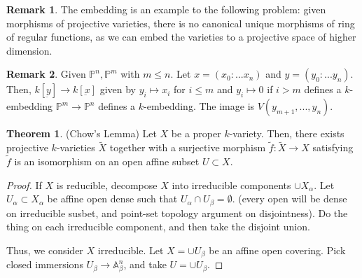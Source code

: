 \documentclass{article}
\theoremstyle{definition}
\newtheorem{theorem}{Theorem}[section]
\theoremstyle{definition}
\theoremstyle{definition}
\newtheorem{remark}{Remark}[theorem]
\theoremstyle{definition}
\theoremstyle{definition}
\theoremstyle{definition}
\theoremstyle{definition}
\begin{document}
\begin{tcolorbox}[colback=green!5!white,colframe=green!30!white]
\begin{remark}
The embedding is an example to the following problem: given morphisms of projective varieties, there is no canonical unique morphisms of ring of regular functions, as we can embed the varieties to a projective space of higher dimension. 
\end{remark}
\end{tcolorbox}


\begin{tcolorbox}[colback=green!5!white,colframe=green!30!white]
\begin{remark}
Given $\mathbb{P}^n, \mathbb{P}^m$ with $m\leq n$. Let $x=(x_0:...x_n)$ and $y=(y_0:...y_n)$. Then, $k[\underbar{y}]\to k[\underbar{x}]$ given by $y_i\mapsto x_i$ for $i\leq m$ and $y_i\mapsto 0$ if $i>m$ defines a $k$-embedding $\mathbb{P}^m\to \mathbb{P}^n$ defines a $k$-embedding. The image is $V(y_{m+1},...,y_n)$. 
\end{remark}
\end{tcolorbox}



\begin{tcolorbox}[colback=red!5!white,colframe=red!30!white]
\begin{theorem}(Chow's Lemma)
Let $X$ be a proper $k$-variety. Then, there exists projective $k$-varieties $\tilde{X}$ together with a surjective morphism $\tilde{f}: \tilde{X}\to X$ satisfying $\tilde{f}$ is an isomorphism on an open affine subset $U\subset X$. 
\end{theorem}
\end{tcolorbox}
\begin{proof}
    If $X$ is reducible, decompose $X$ into irreducible components $\cup X_{\alpha}$. Let $U_{\alpha}\subset X_{\alpha}$ be affine open dense such that $U_{\alpha}\cap U_{\beta}=\emptyset$. (every open will be dense on irreducible susbet, and point-set topology argument on disjointness). Do the thing on each irreducible component, and then take the disjoint union. 

    Thus, we consider $X$ irreducible. Let $X=\cup U_{\beta}$ be an affine open covering. Pick closed immersions $U_{\beta}\to \mathbb{A}_{\beta}^n$, and take $U=\cup U_{\beta}$. 
\end{proof}
\end{document}
